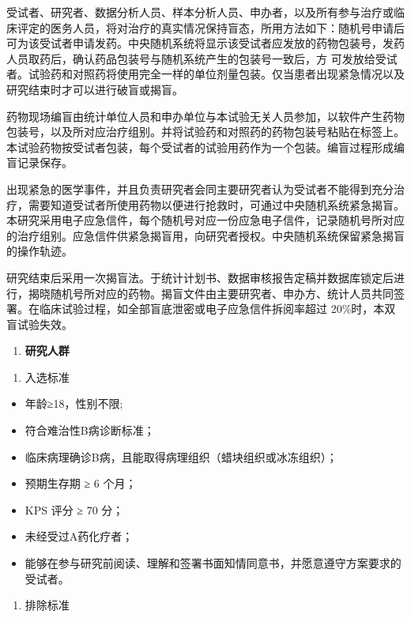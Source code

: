 \documentclass[
  chinese-hans,
  letterpaper,
  DIV=11,
  numbers=noendperiod]{scrreprt}
\providecommand{\tightlist}{%
  \setlength{\itemsep}{0pt}\setlength{\parskip}{0pt}}
\begin{document}
受试者、研究者、数据分析人员、样本分析人员、申办者，以及所有参与治疗或临床评定的医务人员，将对治疗的真实情况保持盲态，所用方法如下：随机号申请后可为该受试者申请发药。中央随机系统将显示该受试者应发放的药物包装号，发药人员取药后，确认药品包装号与随机系统产生的包装号一致后，方
可发放给受试者。试验药和对照药将使用完全一样的单位剂量包装。仅当患者出现紧急情况以及研究结束时才可以进行破盲或揭盲。

药物现场编盲由统计单位人员和申办单位与本试验无关人员参加，以软件产生药物包装号，以及所对应治疗组别。并将试验药和对照药的药物包装号粘贴在标签上。本试验药物按受试者包装，每个受试者的试验用药作为一个包装。编盲过程形成编盲记录保存。

出现紧急的医学事件，并且负责研究者会同主要研究者认为受试者不能得到充分治疗，需要知道受试者所使用药物以便进行抢救时，可通过中央随机系统紧急揭盲。本研究采用电子应急信件，每个随机号对应一份应急电子信件，记录随机号所对应的治疗组别。应急信件供紧急揭盲用，向研究者授权。中央随机系统保留紧急揭盲的操作轨迹。

研究结束后采用一次揭盲法。于统计计划书、数据审核报告定稿并数据库锁定后进行，揭晓随机号所对应的药物。揭盲文件由主要研究者、申办方、统计人员共同签署。在临床试验过程，如全部盲底泄密或电子应急信件拆阅率超过
20\%时，本双盲试验失效。

\begin{enumerate}
\def\labelenumi{\arabic{enumi}.}
\setcounter{enumi}{3}
\tightlist
\item
  \textbf{研究人群}
\end{enumerate}

\begin{enumerate}
\def\labelenumi{\arabic{enumi}.}
\tightlist
\item
  入选标准
\end{enumerate}

\begin{itemize}
\item
  年龄≥18，性别不限;
\item
  符合难治性B病诊断标准；
\item
  临床病理确诊B病，且能取得病理组织（蜡块组织或冰冻组织）；
\item
  预期生存期 ≥ 6 个月；
\item
  KPS 评分 ≥ 70 分；
\item
  未经受过A药化疗者；
\item
  能够在参与研究前阅读、理解和签署书面知情同意书，并愿意遵守方案要求的受试者。
\end{itemize}

\begin{enumerate}
\def\labelenumi{\arabic{enumi}.}
\setcounter{enumi}{1}
\tightlist
\item
  排除标准
\end{enumerate}
\end{document}
